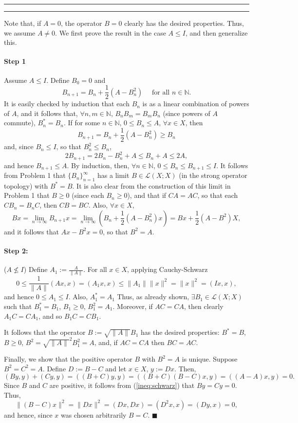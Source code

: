\documentclass[11pt]{article}
\newcounter{questionCounter}
\newcounter{partCounter}[questionCounter]
\newenvironment{question}[2][\arabic{questionCounter}]{%
    \setcounter{partCounter}{0}%
    \vspace{.25in} \hrule \vspace{0.5em}%
        \noindent{\bf #2}%
    \vspace{0.8em} \hrule \vspace{.10in}%
    \addtocounter{questionCounter}{1}%
}{}
\renewcommand{\qed}{\quad \ensuremath{\blacksquare}}
\newcommand{\N}{\mathbb{N}}             %
\renewcommand{\L}{\mathcal{L}}          %
\begin{document}
\newpage
\begin{question}{Problem 2}
Note that, if $A = 0$, the operator $B = 0$ clearly has the desired properties.
Thus, we assume $A \neq 0$. We first prove the result in the case $A \leq I$,
and then generalize this.
\vspace{-5mm}
\paragraph{Step 1} Assume $A \leq I$. Define $B_0 = 0$ and
\[B_{n + 1} = B_n + \frac{1}{2}(A - B_n^2) \quad \mbox{ for all } n \in \N.\]
It is easily checked by induction that each $B_n$ is as a linear combination of
powers of $A$, and it follows that, $\forall n,m \in \N$, $B_nB_m = B_mB_n$
(since powers of $A$ commute), $B_n^* = B_n$. If for some $n \in \N$,
$0 \leq B_n \leq A$, $\forall x \in X$, then
\[B_{n + 1} = B_n + \frac{1}{2}(A - B_n^2) \geq B_n\]
and, since $B_n \leq I$, so that $B_n^2 \leq B_n$,
\[2B_{n + 1} = 2B_n - B_n^2 + A \leq B_n + A \leq 2A,\]
and hence $B_{n + 1} \leq A$. By induction, then, $\forall n \in \N$,
$0 \leq B_n \leq B_{n + 1} \leq I$. It follows from Problem 1 that
$\{B_n\}_{n = 1}^\infty$ has a limit $B \in \L(X;X)$ (in the strong operator
topology) with $B^* = B$. It is also clear from the construction of this limit
in Problem 1 that $B \geq 0$ (since each $B_n \geq 0$), and that if
$CA = AC$, so that each $CB_n = B_nC$, then $CB = BC$. Also, $\forall x \in X$,
\[Bx
    = \lim_{n \to \infty} B_{n + 1} x
    = \lim_{n \to \infty} \left( B_n + \frac{1}{2} (A - B_n^2)x \right)
    = Bx + \frac{1}{2} (A - B^2)X,
\]
and it follows that $Ax - B^2x = 0$, so that $B^2 = A$.
\vspace{-5mm}
\paragraph{Step 2:} ($A \not\leq I$)
Define $A_1 := \frac{A}{\|A\|}$. For all
$x \in X$, applying Cauchy-Schwarz
\vspace{-3mm}
\[0
    \leq \frac{1}{\|A\|} (Ax,x)
    = (A_1x,x)
    \leq \|A_1\| \|x\|^2
    = \|x\|^2
    = (Ix,x),
\]
and hence $0 \leq A_1 \leq I$. Also, $A_1^* = A_1$ Thus, as already shown,
$\exists B_1 \in \L(X;X)$ such that $B_1^* = B_1$, $B_1 \geq 0$, $B_1^2 = A_1$.
Moreover, if $AC = CA$, then clearly $A_1C = CA_1$, and so $B_1C = CB_1$.

It follows that the operator $B := \sqrt{\|A\|}B_1$ has the desired properties:
$B^* = B$, $B \geq 0$, $B^2 = \sqrt{\|A\|}^2 B_1^2 = A$, and, if $AC = CA$ then
$BC = AC$.

Finally, we show that the positive operator $B$ with $B^2 = A$ is unique.
Suppose $B^2 = C^2 = A$. Define $D := B - C$ and let $x \in X$, $y := Dx$.
Then,
\vspace{-2mm}
\[(By,y) + (Cy,y)
    = ((B + C)y,y)
    = ((B + C)(B - C)x,y)
    = ( (A - A)x,y)
    = 0.
\]
Since $B$ and $C$ are positive, it follows from (\ref{ineq:schwarz}) that
$By = Cy = 0$. Thus,
\vspace{-2mm}
\[\|(B - C)x\|^2
    = \|Dx\|^2
    = (Dx,Dx)
    = (D^2x,x)
    = (Dy,x) = 0,
\]
and hence, since $x$ was chosen arbitrarily $B = C$. \qed
\end{question}
\end{document}
